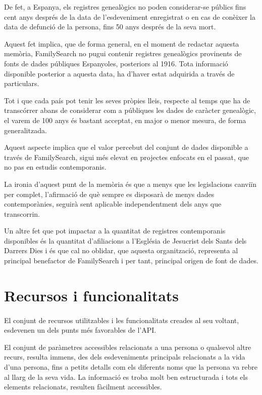     De fet, a Espanya, els registres genealògics no poden considerar-se públics fins cent anys després de la data de l'esdeveniment enregistrat o en cas de conèixer la data de defunció de la persona, fins 50 anys després de la seva mort.

    Aquest fet implica, que de forma general, en el moment de redactar aquesta memòria, FamilySearch no pugui contenir re\-gis\-tres genealògics provinents de fonts de dades públiques Espanyoles, posteriors al 1916. Tota informació disponible posterior a aquesta data, ha d'haver estat adquirida a través de particulars.

    Tot i que cada país pot tenir les seves pròpies lleis, respecte al temps que ha de transcórrer abans de considerar com a públiques les dades de caràcter genealògic, el varem de 100 anys és bastant acceptat, en major o menor mesura, de forma generalitzada.

    Aquest aspecte implica que el valor percebut del conjunt de dades disponible a través de FamilySearch, sigui més elevat en projectes enfocats en el passat, que no pas en estudis contemporanis.

    La ironia d'aquest punt de la memòria és que a menys que les legislacions canviïn per complet, l'afirmació de què sempre es disposarà de menys dades contemporànies, seguirà sent aplicable independentment dels anys que transcorrin.

    Un altre fet que pot impactar a la quantitat de registres contemporanis disponibles és la quantitat d'afiliacions a l'Església de Jesucrist dels Sants dels Darrers Dies i és que cal no oblidar, que aquesta organització, representa al principal benefactor de FamilySearch i per tant, principal origen de font de dades.


\section{Recursos i funcionalitats}

    \paragraph{}
    El conjunt de recursos utilitzables i les funcionalitats creades al seu voltant, esdevenen un dels punts més favorables de l'API.

    El conjunt de paràmetres accessibles relacionats a una persona o qualsevol altre recurs, resulta immens, des dels esdeveniments principals relacionats a la vida d'una persona, fins a petits detalls com els diferents noms que la persona va rebre al llarg de la seva vida. La informació es troba molt ben estructurada i tots els elements relacionats, resulten fàcilment accessibles.

